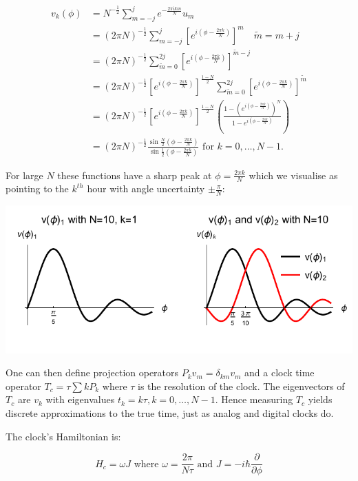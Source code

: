 \documentclass{article}
\begin{document}
\begin{align}
	v_k(\phi) &= N^{-\frac{1}{2}}\sum_{m=-j}^j e^{-\frac{2\pi ikm}{N}}u_m \label{vkexpansion}\\
		    &= (2\pi N)^{-\frac{1}{2}}\sum_{m=-j}^j [e^{i(\phi-\frac{2\pi k}{N})}]^m \quad \tilde{m} = m+j \\
		    &= (2\pi N)^{-\frac{1}{2}}\sum_{\tilde{m}=0}^{2j} [e^{i(\phi-\frac{2\pi k}{N})}]^{\tilde{m}-j} \\
		    &= (2\pi N)^{-\frac{1}{2}}[e^{i(\phi-\frac{2\pi k}{N})}]^{\frac{1-N}{2}}\sum_{\tilde{m}=0}^{2j}[e^{i(\phi-\frac{2\pi k}{N})}]^{\tilde{m}} \\
		    &= (2\pi N)^{-\frac{1}{2}}[e^{i(\phi-\frac{2\pi k}{N})}]^{\frac{1-N}{2}}\left(\frac{1-(e^{i(\phi-\frac{2\pi k}{N})})^N}{1-e^{i(\phi-\frac{2\pi k}{N})}}\right) \\
		    &= (2\pi N)^{-\frac{1}{2}}\frac{\sin{\frac{N}{2}(\phi-\frac{2\pi k}{N})}}{\sin{\frac{1}{2}(\phi-\frac{2\pi k}{N})}} \text{ for } k = 0,\dots,N-1.
\end{align}

\noindent For large $N$ these functions have a sharp peak at $\phi = \frac{2\pi k}{N}$ which we visualise as pointing to the $k^{th}$ hour with angle uncertainty $\pm \frac{\pi}{N}$:

\begin{center}
\includegraphics{plot1.pdf}
\end{center}

\noindent One can then define projection operators $P_kv_m=\delta_{km}v_m$ and a clock time operator $T_c = \tau\sum{kP_k}$ where $\tau$ is the resolution of the clock. The eigenvectors of $T_c$ are $v_k$ with eigenvalues $t_k = k\tau, k=0,\dots,N-1$. Hence measuring $T_c$ yields discrete approximations to the true time, just as analog and digital clocks do. 

\noindent The clock's Hamiltonian is:

\begin{equation}
	H_c = \omega J \text{ where } \omega = \frac{2\pi}{N\tau} \text{ and } J=-i\hbar \frac{\partial}{\partial\phi}
	\label{clockhamiltonian}
\end{equation}
\end{document}
